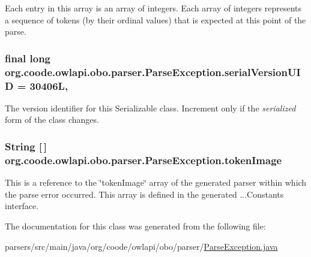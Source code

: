 Each entry in this array is an array of integers. Each array of integers represents a sequence of tokens (by their ordinal values) that is expected at this point of the parse. \hypertarget{classorg_1_1coode_1_1owlapi_1_1obo_1_1parser_1_1_parse_exception_aa6e30bd11d64c9a5627ebe4d0a633f98}{
\subsubsection[{serial\-Version\-U\-I\-D}]{\setlength{\rightskip}{0pt plus 5cm}final long org.\-coode.\-owlapi.\-obo.\-parser.\-Parse\-Exception.\-serial\-Version\-U\-I\-D = 30406\-L\hspace{0.3cm}{\ttfamily [static]}, {\ttfamily [private]}}}\label{classorg_1_1coode_1_1owlapi_1_1obo_1_1parser_1_1_parse_exception_aa6e30bd11d64c9a5627ebe4d0a633f98}
The version identifier for this Serializable class. Increment only if the {\itshape serialized} form of the class changes. \hypertarget{classorg_1_1coode_1_1owlapi_1_1obo_1_1parser_1_1_parse_exception_a5225490b27f6841ebc077a8a08712304}{
\subsubsection[{token\-Image}]{\setlength{\rightskip}{0pt plus 5cm}String \mbox{[}$\,$\mbox{]} org.\-coode.\-owlapi.\-obo.\-parser.\-Parse\-Exception.\-token\-Image}}\label{classorg_1_1coode_1_1owlapi_1_1obo_1_1parser_1_1_parse_exception_a5225490b27f6841ebc077a8a08712304}
This is a reference to the \char`\"{}token\-Image\char`\"{} array of the generated parser within which the parse error occurred. This array is defined in the generated ...Constants interface. 

The documentation for this class was generated from the following file\-:\begin{DoxyCompactItemize}
\item 
parsers/src/main/java/org/coode/owlapi/obo/parser/\hyperlink{org_2coode_2owlapi_2obo_2parser_2_parse_exception_8java}{Parse\-Exception.\-java}\end{DoxyCompactItemize}
